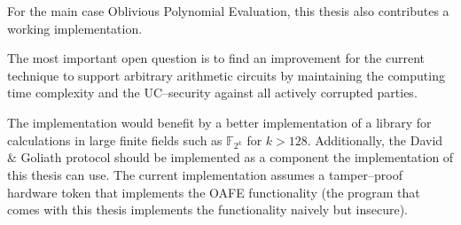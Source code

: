 For the main case Oblivious Polynomial Evaluation, this thesis also contributes
a working implementation.


%
%
\label{sec:outlook}

The most important open question is to find an improvement for the current
technique to support arbitrary arithmetic circuits by maintaining the computing
time complexity and the UC--security against all actively corrupted parties.

The implementation would benefit by a better implementation of a library for
calculations in large finite fields such as $\mathbb{F}_{2^{k}}$ for $k > 128$.
Additionally, the David \& Goliath protocol \cite{davidgoliath} should be
implemented as a component the implementation of this thesis can use. The
current implementation assumes a tamper--proof hardware token that implements
the OAFE functionality (the program \JWBtoken{} that comes with this thesis
implements the functionality naively but insecure).

